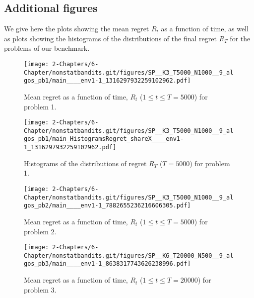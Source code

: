 \subsection{Additional figures}\label{app:6:moreFigures}

We give here the plots showing the mean regret $R_t$ as a function of time, as well as plots showing the histograms of the distributions of the final regret $R_T$ for the problems of our benchmark.

\begin{figure}[h!]  %
    \centering
    \texttt{[image: 2-Chapters/6-Chapter/nonstatbandits.git/figures/SP\_\_K3\_T5000\_N1000\_\_9\_algos\_pb1/main\_\_\_\_env1-1\_1316297932259102962.pdf]}
    \caption{Mean regret as a function of time, $R_t$ ($1 \leq t \leq T = 5000$) for problem 1.}
    \label{fig:6:meanRegretPb1}
\end{figure}

\begin{figure}[h!]  %
    \centering
    \texttt{[image: 2-Chapters/6-Chapter/nonstatbandits.git/figures/SP\_\_K3\_T5000\_N1000\_\_9\_algos\_pb1/main\_HistogramsRegret\_shareX\_\_\_\_env1-1\_1316297932259102962.pdf]}
    \caption{Histograms of the distributions of regret $R_T$ ($T=5000$) for problem 1.}
    \label{fig:6:histogramRegretPb1}
\end{figure}

\begin{figure}[h!]  %
    \centering
    \texttt{[image: 2-Chapters/6-Chapter/nonstatbandits.git/figures/SP\_\_K3\_T5000\_N1000\_\_9\_algos\_pb2/main\_\_\_\_env1-1\_7882655236216606305.pdf]}
    \caption{Mean regret as a function of time, $R_t$ ($1 \leq t \leq T = 5000$) for problem $2$.}
    \label{fig:6:meanRegretPb2}
\end{figure}

\begin{figure}[h!]  %
    \centering
    \texttt{[image: 2-Chapters/6-Chapter/nonstatbandits.git/figures/SP\_\_K6\_T20000\_N500\_\_9\_algos\_pb3/main\_\_\_\_env1-1\_8638317743626238996.pdf]}
    \caption{Mean regret as a function of time, $R_t$ ($1 \leq t \leq T = 20000$) for problem 3.}
    \label{fig:6:meanRegretPb3}
\end{figure}

